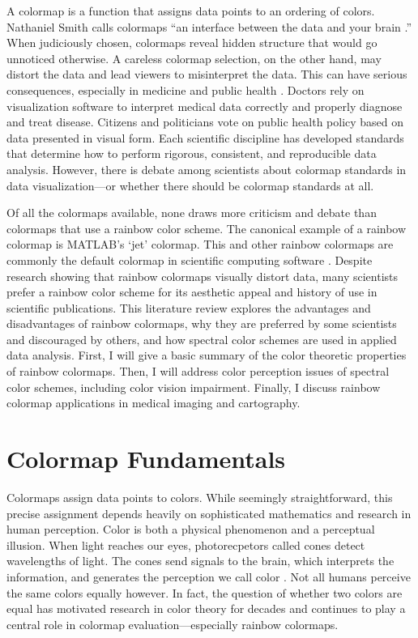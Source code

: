 \documentclass[journal,12pt]{IEEEtran}
\begin{document}
A colormap is a function that assigns data points to
an ordering of colors. Nathaniel Smith
calls colormaps ``an interface between the data and your
brain \cite{viridis}.''
When judiciously chosen, colormaps reveal hidden structure that would go unnoticed
otherwise. A careless colormap selection, on the other hand, may distort the data and
lead viewers to misinterpret the data. This can have
serious consequences, especially in medicine and public health \cite{arteryvis,choropleth}.
Doctors rely on visualization software to interpret medical
data correctly and properly diagnose and treat disease.
Citizens and politicians vote on public health policy based on data presented 
in visual form. Each scientific discipline has developed standards that determine
how to perform rigorous, consistent, and reproducible data analysis. However,
there is debate among scientists about colormap standards in data visualization---or
whether there should be colormap standards at all.

Of all the colormaps available, none draws more criticism and debate than colormaps that use a rainbow
color scheme. The canonical example of a rainbow colormap is MATLAB's `jet' colormap. This and other rainbow
colormaps are commonly the default colormap in scientific computing software \cite{viridis,matlab}.
Despite research showing that rainbow colormaps visually distort data, many scientists
prefer a rainbow color scheme for its aesthetic appeal
and history of use in scientific publications. This literature
review explores the advantages and disadvantages
of rainbow colormaps, why they are preferred by some
scientists and discouraged by others, and how spectral color schemes are used
in applied data analysis. First, I will give a basic summary 
of the color theoretic properties of rainbow colormaps. Then, I will
address color perception issues of spectral color schemes, including
color vision impairment. Finally, I discuss rainbow colormap applications
in medical imaging and cartography.

\section{Colormap Fundamentals}

Colormaps assign data points to colors. While seemingly straightforward, this precise assignment
depends heavily on sophisticated mathematics and research in human perception. 
Color is both a physical phenomenon and a perceptual illusion.
When light reaches our eyes, photorecpetors called cones detect wavelengths
of light. The cones send signals to the brain, which interprets the information,
and generates the perception we call color \cite{viridis}. Not all humans perceive the same
colors equally however. In fact, the question of whether two colors are equal has motivated
research in color theory for decades and continues to play a central role in colormap 
evaluation---especially rainbow colormaps.
\end{document}
